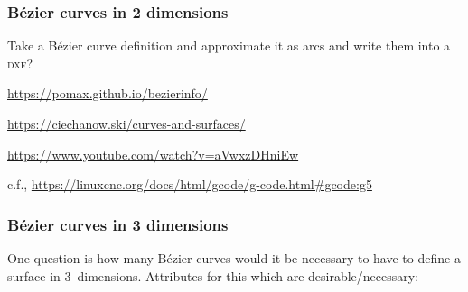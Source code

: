 \documentclass{ltxdoc}
\begin{document}
\subsubsection{Bézier curves in 2 dimensions}

Take a Bézier curve definition and approximate it as arcs and write them into a \textsc{dxf}?

\url{https://pomax.github.io/bezierinfo/}

\url{https://ciechanow.ski/curves-and-surfaces/}

\url{https://www.youtube.com/watch?v=aVwxzDHniEw}

c.f., \url{https://linuxcnc.org/docs/html/gcode/g-code.html#gcode:g5}

%
%
%
%
%
%
%
%

\subsubsection{Bézier curves in 3 dimensions}
 
One question is how many Bézier curves would it be necessary to have to define a surface in 3~dimensions. Attributes for this which are desirable/necessary:
\end{document}
